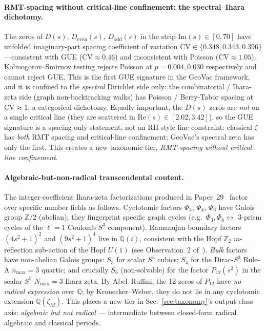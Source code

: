 \documentclass[aps,pra,twocolumn,superscriptaddress,longbibliography]{revtex4-2}
\begin{document}
\paragraph{RMT-spacing without critical-line confinement: the
spectral--Ihara dichotomy.}  The zeros of $D(s)$,
$D_{\mathrm{even}}(s)$, $D_{\mathrm{odd}}(s)$ in the strip
$\mathrm{Im}(s) \in [0, 70]$ have unfolded imaginary-part spacing
coefficient of variation $\mathrm{CV} \in \{0.348, 0.343, 0.396\}$
---consistent with GUE ($\mathrm{CV} \approx 0.46$) and inconsistent
with Poisson ($\mathrm{CV} \approx 1.05$). Kolmogorov--Smirnov testing
rejects Poisson at $p = 0.004, 0.030$ respectively and cannot reject
GUE. This is the first GUE signature in the GeoVac framework, and
it is confined to the \emph{spectral} Dirichlet side only: the
combinatorial / Ihara-zeta side (graph non-backtracking walks) has
Poisson / Berry-Tabor spacing at $\mathrm{CV} \approx 1$, a categorical
dichotomy. Equally important, the $D(s)$ zeros are \emph{not} on a
single critical line (they are scattered in
$\mathrm{Re}(s) \in [2.02, 3.42]$), so the GUE signature is a
spacing-only statement, not an RH-style line constraint: classical
$\zeta$ has \emph{both} RMT spacing and critical-line confinement;
GeoVac's spectral zeta has only the first. This creates a new
taxonomic tier, \emph{RMT-spacing without critical-line confinement}.

\paragraph{Algebraic-but-non-radical transcendental content.}
The integer-coefficient Ihara-zeta factorizations produced in
Paper~29~\cite{loutey_paper29} factor over specific number fields as
follows. Cyclotomic factors $\Phi_3$, $\Phi_4$, $\Phi_6$ have Galois
group $\mathbb{Z}/2$ (abelian); they fingerprint specific graph cycles
(e.g.~$\Phi_3, \Phi_6 \leftrightarrow$ 3-prism cycles of the $\ell=1$
Coulomb $S^3$ component). Ramanujan-boundary factors
$(4s^2+1)^2$ and $(9s^2+1)^4$ live in $\mathbb{Q}(i)$, consistent
with the Hopf $\mathbb{Z}_2$ $m$-reflection sub-action of the
Hopf $U(1)$ (see Observation~2 of~\cite{loutey_paper29}).
\emph{Bulk} factors have non-abelian Galois groups: $S_3$ for scalar
$S^3$ cubics; $S_4$ for the Dirac-$S^3$ Rule-A $n_{\max}=3$ quartic;
and crucially $S_6$ (non-solvable) for the factor $P_{12}(s^2)$ in
the scalar $S^5$ $N_{\max}=3$ Ihara zeta. By Abel--Ruffini, the 12
zeros of $P_{12}$ have \emph{no radical expression} over
$\mathbb{Q}$; by Kronecker--Weber, they do not lie in any cyclotomic
extension $\mathbb{Q}(\zeta_M)$. This places a new tier in
Sec.~\ref{sec:taxonomy}'s output-class axis: \emph{algebraic but
not radical} --- intermediate between closed-form radical algebraic
and classical periods.
\end{document}
